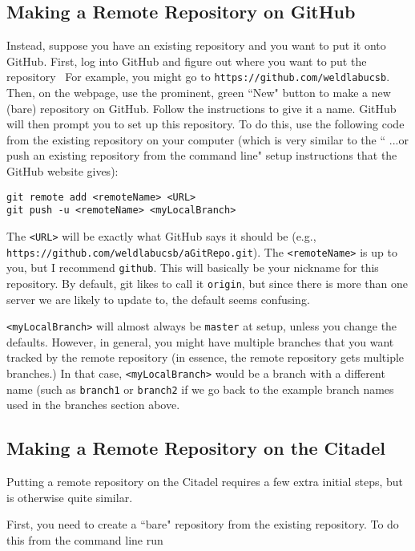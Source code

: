 \documentclass[11pt]{article}
\newcommand{\code}[1]{\begin{adjustwidth}{0.5in}{0in}
    \texttt{#1}
    \end{adjustwidth}}
\begin{document}
\subsection{Making a Remote Repository on GitHub}

Instead, suppose you have an existing repository and you want to put it onto GitHub.  First, log into GitHub and figure out where you want to put the repository \textemdash\ For example, you might go to \texttt{https://github.com/weldlabucsb}.  Then, on the webpage, use the prominent, green ``New" button to make a new (bare) repository on GitHub.  Follow the instructions to give it a name.  GitHub will then prompt you to set up this repository.  To do this, use the following code from the existing repository on your computer (which is very similar to the `` ...or push an existing repository from the command line" setup instructions that the GitHub website gives):

\code{git remote add <remoteName> <URL>\\
git push -u <remoteName> <myLocalBranch>}

The \texttt{<URL>} will be exactly what GitHub says it should be (e.g., \texttt{https://github.com/weldlabucsb/aGitRepo.git}).  The \texttt{<remoteName>} is up to you, but I recommend \texttt{github}.  This will basically be your nickname for this repository.  By default, git likes to call it \texttt{origin}, but since there is more than one server we are likely to update to, the default seems confusing.

\texttt{<myLocalBranch>} will almost always be \texttt{master} at setup, unless you change the defaults.  However, in general, you might have multiple branches that you want tracked by the remote repository (in essence, the remote repository gets multiple branches.)  In that case, \texttt{<myLocalBranch>} would be a branch with a different name (such as \texttt{branch1} or \texttt{branch2} if we go back to the example branch names used in the branches section above.

\subsection{Making a Remote Repository on the Citadel}

Putting a remote repository on the Citadel requires a few extra initial steps, but is otherwise quite similar.  

First, you need to create a ``bare" repository from the existing repository.  To do this from the command line run
\end{document}
